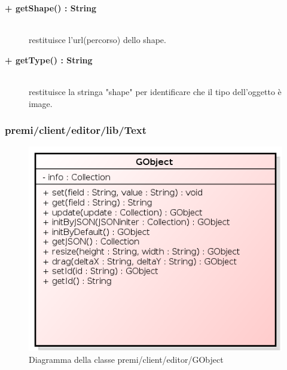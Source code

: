 \begin{description}
\begin{description}
\end{description}

\begin{description}
		\item[\textbf{\color{blue}+ getShape() : String			}] \hfill \\
			restituisce l'url(percorso) dello shape. 

\end{description}

\begin{description}
		\item[\textbf{\color{blue}+ getType() : String			}] \hfill \\
			restituisce la stringa "shape" per identificare che il tipo dell'oggetto è image. 

\end{description}



\end{description}


\subsubsection{premi/client/editor/lib/Text}
\begin{figure}[h]
\begin{center}
\includegraphics[scale=0.40]{img/diacla/GObject.png}
\caption{Diagramma della classe premi/client/editor/GObject}
\end{center}
\end{figure}

